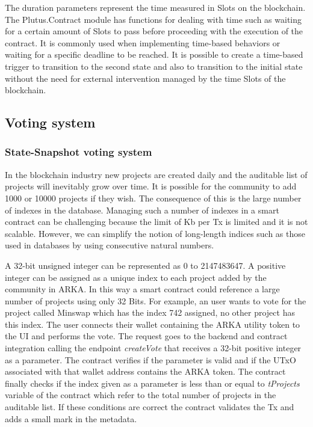 \documentclass[12pt]{article}
\begin{document}
 The duration parameters represent the time measured in Slots on the blockchain. The Plutus.Contract module has functions for dealing with time such as waiting for a certain amount of Slots to pass before proceeding with the execution of the contract. It is commonly used when implementing time-based behaviors or waiting for a specific deadline to be reached. It is possible to create a time-based trigger to transition to the second state and also to transition to the initial state without the need for external intervention managed by the time Slots of the blockchain.


\subsection { Voting system } 


\subsubsection { State-Snapshot voting system } 


In the blockchain industry new projects are created daily and the auditable list of projects will inevitably grow over time. It is possible for the community to add 1000 or 10000 projects if they wish. The consequence of this is the large number of indexes in the database. Managing such a number of indexes in a smart contract can be challenging because the limit of Kb per Tx is limited and it is not scalable. However, we can simplify the notion of long-length indices such as those used in databases by using consecutive natural numbers.

A 32-bit unsigned integer can be represented as 0 to 2147483647. A positive integer can be assigned as a unique index to each project added by the community in ARKA. In this way a smart contract could reference a large number of projects using only 32 Bits. For example, an user wants to vote for the project called Minswap which has the index 742 assigned, no other project has this index. The user connects their wallet containing the ARKA utility token to the UI and performs the vote. The request goes to the backend and contract integration calling the endpoint \emph{createVote} that receives a 32-bit positive integer as a parameter. The contract verifies if the parameter is valid and if the UTxO associated with that wallet address contains the ARKA token. The contract finally checks if the index given as a parameter is less than or equal to \emph{tProjects} variable of the contract which refer to the total number of projects in the auditable list. If these conditions are correct the contract validates the Tx and adds a small mark in the metadata.
\end{document}
